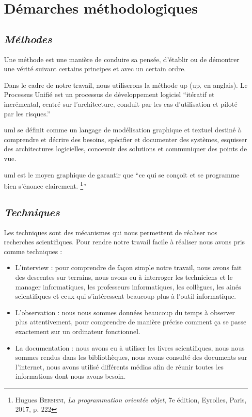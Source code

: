     \section[Démarches méthodologiques]{Démarches méthodologiques}
        \subsection[Méthodes]{\textit{Méthodes}}
        Une méthode est une manière de conduire sa pensée, d’établir ou de démontrer une
        vérité suivant certains principes et avec un certain ordre.
        \par
        Dans le cadre de notre travail, nous utiliserons la méthode \acrshort{up} (\acrlong{up}, en anglais).
        Le Processus Unifié est un processus de développement logiciel \enquote{itératif et incrémental,
        centré sur l’architecture, conduit par les cas d’utilisation et piloté par les risques.} \cite{Roques2008}
        \par
        \acrshort{uml} se définit comme un langage de modélisation graphique et textuel destiné à
        comprendre et décrire des besoins, spécifier et documenter des systèmes, esquisser des
        architectures logicielles, concevoir des solutions et communiquer des points de vue. \cite{RoqVall2007}
        \par
        \acrshort{uml} est le moyen graphique de garantir que \enquote{ce qui se conçoit et se programme
        bien s’énonce clairement. \footnote[2]{Hugues \textsc{Bersisni}, \textit{La programmation orientée objet}, 7e édition, Eyrolles, Paris, 2017, p. 222}}
        \subsection[Techniques]{\textit{Techniques}}
        Les techniques sont des mécanismes qui nous permettent de réaliser nos recherches
        scientifiques. Pour rendre notre travail facile à réaliser nous avons pris comme techniques : 
        \par
        \begin{itemize}
            \setlength{\itemsep}{0pt}
            \item [\ding{226}] L’interview : pour comprendre de façon simple notre travail, nous avons fait des
            descentes sur terrains, nous avons eu à interroger les techniciens et le manager
            informatiques, les professeurs informatiques, les collègues, les ainés scientifiques
            et ceux qui s’intéressent beaucoup plus à l’outil informatique.
            \item [\ding{226}] L’observation : nous nous sommes données beaucoup du temps à observer plus
            attentivement, pour comprendre de manière précise comment ça se passe exactement sur un ordinateur fonctionnel.
            \item [\ding{226}] La documentation : nous avons eu à utiliser les
            livres scientifiques, nous nous sommes rendus dans les bibliothèques, nous avons
            consulté des documents sur l’internet, nous avons utilisé différents médias afin de
            réunir toutes les informations dont nous avons besoin.
        \end{itemize}
